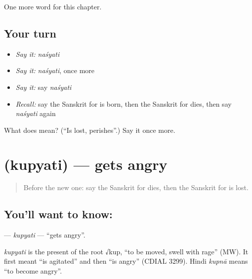 \begin{grammarlens}[title={What you've built}]
One more word for this chapter.
\end{grammarlens}

\subsection*{Your turn}
\begin{itemize}
\raggedright
  \item \emph{Say it:} \emph{naśyati}
  \item \emph{Say it:} \emph{naśyati}, once more
  \item \emph{Say it:} say \emph{naśyati}
  \item \emph{Recall:} say the Sanskrit for is born, then the Sanskrit for dies, then say \emph{naśyati} again
\end{itemize}

\begin{tcolorbox}[breakable,colback=teal!4,colframe=teal!35!black,title={Before you move on}]
What does  mean? (\textquotedblleft{}Is lost, perishes\textquotedblright{}.) Say it once more.
\end{tcolorbox}
\section[\texorpdfstring{\sk{कुप्यति} (kupyati)}{कुप्यति (kupyati)}]{ (kupyati) — gets angry}

\label{lesson:SA-C232-kupyati}



\begin{quote}
Before the new one: say the Sanskrit for dies, then the Sanskrit for is lost.
\end{quote}

\subsection*{You'll want to know: }
\textbf{} — \emph{kupyati} — \textquotedblleft{}gets angry\textquotedblright{}.

\begin{cousinweb}
\emph{kupyati} is the present of the root √kup, \textquotedblleft{}to be moved, swell with rage\textquotedblright{} (MW). It first meant \textquotedblleft{}is agitated\textquotedblright{} and then \textquotedblleft{}is angry\textquotedblright{} (CDIAL 3299). Hindi \emph{kupnā} means \textquotedblleft{}to become angry\textquotedblright{}.
\end{cousinweb}

